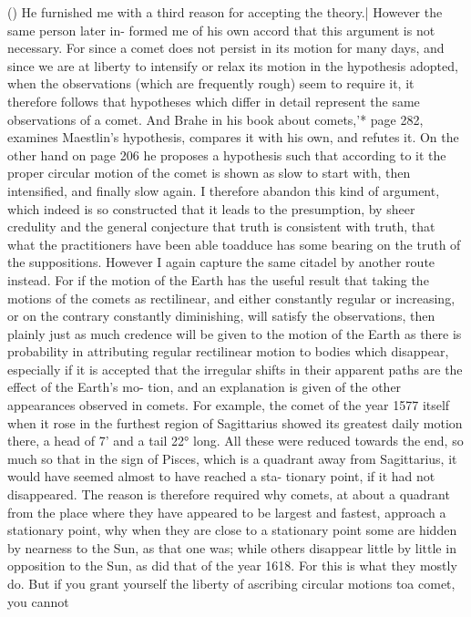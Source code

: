 \documentclass{article}
\begin{document}
{{{{{{{{{{{{{{{{{{{{{{{{{{{{{{{{{{{() He furnished me with a third reason for accepting the theory.| However the same person later in-
formed me of his own accord that this argument is not necessary. For since a comet does not persist in its
motion for many days, and since we are at liberty to intensify or relax its motion in the hypothesis
adopted, when the observations (which are frequently rough) seem to require it, it therefore follows that
hypotheses which differ in detail represent the same observations of a comet. And Brahe in his book
about comets,'* page 282, examines Maestlin’s hypothesis, compares it with his own, and refutes it. On
the other hand on page 206 he proposes a hypothesis such that according to it the proper circular motion
of the comet is shown as slow to start with, then intensified, and finally slow again. I therefore abandon
this kind of argument, which indeed is so constructed that it leads to the presumption, by sheer credulity
and the general conjecture that truth is consistent with truth, that what the practitioners have been able
toadduce has some bearing on the truth of the suppositions. However I again capture the same citadel by
another route instead. For if the motion of the Earth has the useful result that taking the motions of the
comets as rectilinear, and either constantly regular or increasing, or on the contrary constantly
diminishing, will satisfy the observations, then plainly just as much credence will be given to the motion
of the Earth as there is probability in attributing regular rectilinear motion to bodies which disappear,
especially if it is accepted that the irregular shifts in their apparent paths are the effect of the Earth’s mo-
tion, and an explanation is given of the other appearances observed in comets. For example, the comet of
the year 1577 itself when it rose in the furthest region of Sagittarius showed its greatest daily motion
there, a head of 7' and a tail 22° long. All these were reduced towards the end, so much so that in the sign
of Pisces, which is a quadrant away from Sagittarius, it would have seemed almost to have reached a sta-
tionary point, if it had not disappeared. The reason is therefore required why comets, at about a
quadrant from the place where they have appeared to be largest and fastest, approach a stationary point,
why when they are close to a stationary point some are hidden by nearness to the Sun, as that one was;
while others disappear little by little in opposition to the Sun, as did that of the year 1618. For this is what
they mostly do. But if you grant yourself the liberty of ascribing circular motions toa comet, you cannot
}}}}}}}}}}}}}}}}}}}}}}}}}}}}}}}}}}}
\end{document}
